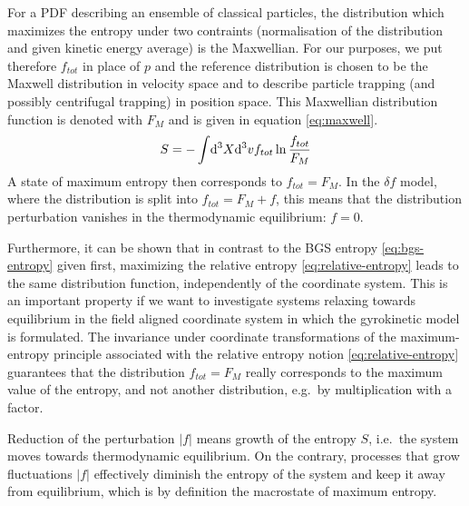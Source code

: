 For a PDF describing an ensemble of classical particles, the distribution which maximizes the entropy under two contraints (normalisation of the distribution and given kinetic energy average) is the Maxwellian. 
For our purposes, we put therefore $f_{tot}$ in place of $p$ and the reference
distribution is chosen to be the Maxwell distribution in velocity space and to
describe particle trapping (and possibly centrifugal trapping) in position space.
This Maxwellian distribution function is denoted with $F_M$ and is given in equation \eqref{eq:maxwell}.
\begin{equation}
  \label{eq:relative-entropy-with-f}
  S = -\int\!\mathrm{d}^3X\mathrm{d}^3v f_{tot}\ln \frac{f_{tot}}{F_M}
\end{equation}
A state of maximum entropy then corresponds to $f_{tot} = F_M$. In the $\delta f$ model, where the distribution is split into $f_{tot} = F_M + f$, this means that the distribution perturbation vanishes in the thermodynamic equilibrium: $f = 0$.

Furthermore, it can be shown \cite{DUN07} that in contrast to the BGS entropy \ref{eq:bgs-entropy} given first, maximizing the relative entropy \ref{eq:relative-entropy} leads to the same distribution function, independently of the coordinate system. This is an important property if we want to investigate systems relaxing towards equilibrium in the field aligned coordinate system in which the gyrokinetic model is formulated. The invariance under coordinate transformations of the maximum-entropy principle associated with the relative entropy notion \ref{eq:relative-entropy} guarantees that the distribution $f_{tot} = F_M$ really corresponds to the maximum value of the entropy, and not another distribution, e.g.\ by multiplication with a factor.

Reduction of the perturbation $|f|$ means growth of the entropy $S$, i.e.\ the system moves towards thermodynamic equilibrium. On the contrary, processes that grow fluctuations $|f|$ effectively diminish the entropy of the system and keep it away from equilibrium, which is by definition the macrostate of maximum entropy.

